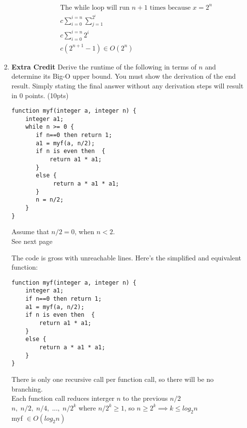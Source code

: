 \documentclass[11pt]{article}
\begin{document}
\begin{enumerate}
\begin{enumerate}
            \begin{align*}
                &\text{The while loop will run } n + 1 \text{ times because } x = 2^n \\
                &c\sum_{i = 0}^{i = n} \sum_{j = 1}^{2^i} \\
                &c\sum_{i = 0}^{i = n} 2^i \\
                &c(2^{n + 1} - 1) \in O(2^n)
            \end{align*}

        \end{enumerate}


        \item \textbf{Extra Credit} Derive the runtime of the following in
        terms of $n$ and determine its Big-O upper bound. You must show
        the derivation of the end result. Simply stating the final answer
        without any derivation steps will result in 0 points.
        \hfill (10pts)

        \begin{verbatim}
function myf(integer a, integer n) {
    integer a1;
    while n >= 0 {
       if n==0 then return 1;
       a1 = myf(a, n/2);       
       if n is even then  {
           return a1 * a1;
       }
       else {
            return a * a1 * a1;   
       }
       n = n/2;
    }     
}
        \end{verbatim}
        Assume that $n/2 = 0$, when $n<2$. \\
        See next page
        \newpage




        The code is gross with unreachable lines. Here's the simplified and equivalent function:

        \begin{verbatim}
function myf(integer a, integer n) {
    integer a1;
    if n==0 then return 1;
    a1 = myf(a, n/2);
    if n is even then  {
        return a1 * a1;
    }
    else {
        return a * a1 * a1;
    }
}
        \end{verbatim}
        There is only one recursive call per function call, so there will be no branching. \\
        Each function call reduces interger $n$ to the previous $n / 2$ \\
        $n,\; n/2,\; n/4,\;...,\; n/2^k$ where $n/2^k \geq 1$, so $n \geq 2^k \implies k \leq log_2 n$ \\
        myf $\in O(log_2 n)$

    \end{enumerate}
\end{document}
